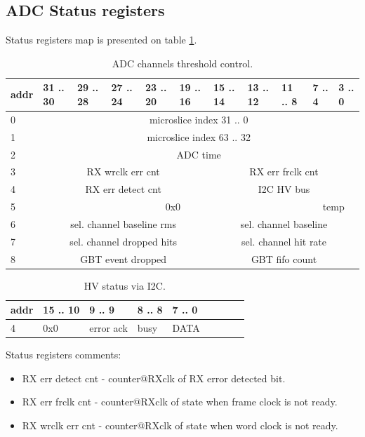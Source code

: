 \documentclass{article}
\begin{document}
\subsection{ADC Status registers}

Status registers map is presented on table \ref{tab8}. 

\begin{table}[H]
\centering
\begin{tabular}{| l | l | l | l | l | l | l | l | l | l | l |}
\hline
addr & 31 .. 30 & 29 .. 28 & 27 .. 24 & 23 .. 20 & 19 .. 16 & 15 .. 14 & 13 .. 12 & 11 .. 8 & 7 .. 4 & 3 .. 0 \\ \hline
0 & \multicolumn{10}{c|}{microslice index 31 .. 0}\\ \hline
1 & \multicolumn{10}{c|}{microslice index 63 .. 32}\\ \hline
2 & \multicolumn{10}{c|}{ADC time}\\ \hline
3 & \multicolumn{5}{c|}{RX wrclk err cnt} & \multicolumn{5}{c|}{RX err frclk cnt} \\ \hline
4 & \multicolumn{5}{c|}{RX err detect cnt} & \multicolumn{5}{c|}{I2C HV bus}\\ \hline
5 & \multicolumn{8}{c|}{0x0} & \multicolumn{2}{c|}{temp} \\ \hline
6 & \multicolumn{5}{c|}{sel. channel baseline rms} & \multicolumn{5}{c|}{sel. channel baseline}\\ \hline
7 & \multicolumn{5}{c|}{sel. channel dropped hits} & \multicolumn{5}{c|}{sel. channel hit rate}\\ \hline
8 & \multicolumn{5}{c|}{GBT event dropped} & \multicolumn{5}{c|}{GBT fifo count}\\ \hline
\end{tabular}
\caption{ADC channels threshold control.\label{tab8}}
\end{table}

\begin{table}[H]
\centering
\begin{tabular}{| l | l | l | l | l | l | l | l | l |}
\hline
addr & 15 .. 10 & 9 .. 9 & 8 .. 8 & 7 .. 0 \\ \hline
4 & 0x0 & error ack & busy & DATA \\ \hline
\end{tabular}
\caption{HV status via I2C.\label{tab9}}
\end{table}

Status registers comments:
\begin{itemize}
\item RX err detect cnt - counter@RXclk of RX error detected bit.

\item RX err frclk cnt - counter@RXclk of state when frame clock is not ready.

\item RX wrclk err cnt - counter@RXclk of state when word clock is not ready.
\end{itemize}
\end{document}
